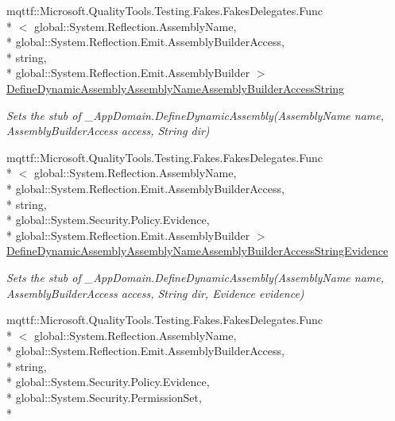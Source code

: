 \begin{DoxyCompactItemize}
mqttf\-::\-Microsoft.\-Quality\-Tools.\-Testing.\-Fakes.\-Fakes\-Delegates.\-Func\\*
$<$ global\-::\-System.\-Reflection.\-Assembly\-Name, \\*
global\-::\-System.\-Reflection.\-Emit.\-Assembly\-Builder\-Access, \\*
string, \\*
global\-::\-System.\-Reflection.\-Emit.\-Assembly\-Builder $>$ \hyperlink{class_system_1_1_fakes_1_1_stub___app_domain_acbd5f9ff1f9c013e6f8d598e149dd803}{Define\-Dynamic\-Assembly\-Assembly\-Name\-Assembly\-Builder\-Access\-String}
\begin{DoxyCompactList}\small\item\em Sets the stub of \-\_\-\-App\-Domain.\-Define\-Dynamic\-Assembly(\-Assembly\-Name name, Assembly\-Builder\-Access access, String dir)\end{DoxyCompactList}\item 
mqttf\-::\-Microsoft.\-Quality\-Tools.\-Testing.\-Fakes.\-Fakes\-Delegates.\-Func\\*
$<$ global\-::\-System.\-Reflection.\-Assembly\-Name, \\*
global\-::\-System.\-Reflection.\-Emit.\-Assembly\-Builder\-Access, \\*
string, \\*
global\-::\-System.\-Security.\-Policy.\-Evidence, \\*
global\-::\-System.\-Reflection.\-Emit.\-Assembly\-Builder $>$ \hyperlink{class_system_1_1_fakes_1_1_stub___app_domain_a999e56770674d92f305c85c0d119583a}{Define\-Dynamic\-Assembly\-Assembly\-Name\-Assembly\-Builder\-Access\-String\-Evidence}
\begin{DoxyCompactList}\small\item\em Sets the stub of \-\_\-\-App\-Domain.\-Define\-Dynamic\-Assembly(\-Assembly\-Name name, Assembly\-Builder\-Access access, String dir, Evidence evidence)\end{DoxyCompactList}\item 
mqttf\-::\-Microsoft.\-Quality\-Tools.\-Testing.\-Fakes.\-Fakes\-Delegates.\-Func\\*
$<$ global\-::\-System.\-Reflection.\-Assembly\-Name, \\*
global\-::\-System.\-Reflection.\-Emit.\-Assembly\-Builder\-Access, \\*
string, \\*
global\-::\-System.\-Security.\-Policy.\-Evidence, \\*
global\-::\-System.\-Security.\-Permission\-Set, \\*

\end{DoxyCompactItemize}
